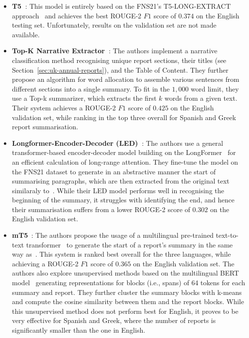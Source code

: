 \begin{itemize}
    \item \textbf{T5~\cite{pant-chopra-2022-multilingual}}: This model is entirely based on the FNS21's T5-LONG-EXTRACT
    approach~\cite{orzhenovskii-2021-t5} and achieves the best ROUGE-2 $F1$ score of $0.374$ on the English testing set.
    Unfortunately, results on the validation set are not made available.

    \item \textbf{Top-K Narrative Extractor~\cite{shukla-etal-2022-dimsum}}: The authors implement a narrative
    classification method recognising unique report sections, their titles (see Section~\ref{sec:uk-annual-reports}), and the Table of Content.
    They further propose an algorithm for word allocation to assemble various sentences from different sections into a single summary.
    To fit in the $1,000$ word limit, they use a Top-k summarizer, which extracts the first $k$ words from a given text.
    Their system achieves a ROUGE-2 $F1$ score of $0.425$ on the English validation set, while ranking in the top three
    overall for Spanish and Greek report summarisation.

    \item \textbf{Longformer-Encoder-Decoder (LED)~\cite{khanna-etal-2022-transformer}}: The authors use a general
    transformer-based encoder-decoder model building on the LongFormer~\cite{Beltagy2020LongformerTL} for an efficient calculation of long-range attention.
    They fine-tune the model on the FNS21 dataset to generate in an abstractive manner the start of summarising paragraphs, which are then extracted from the original text similaraly to~\cite{orzhenovskii-2021-t5}.
    While their LED model performs well in recognising the beginning of the summary, it struggles with identifying the end,
    and hence their summarisation suffers from a lower ROUGE-2 score of $0.302$ on the English validation set.

    \item \textbf{mT5}~\cite{foroutan-etal-2022-multilingual}: The authors propose the usage of a multilingual
    pre-trained text-to-text transformer~\cite{raffel2020exploring} to generate the start of a report's summary in the same way
    as~\cite{orzhenovskii-2021-t5, khanna-etal-2022-transformer}.
    This system is ranked best overall for the three languages, while achieving a ROUGE-2 $F1$ score of $0.365$ on the English validation set.
    The authors also explore unsupervised methods based on the multilingual BERT model~\cite{devlin-etal-2019-bert} generating
    representations for blocks (i.e., spans) of 64 tokens for each summary and report.
    They further cluster the summary blocks with k-means and compute the cosine similarity between them and the report blocks.
    While this unsupervised method does not perform best for English, it proves to be very effective for Spanish and Greek, where
    the number of reports is significantly smaller than the one in English.
\end{itemize}

